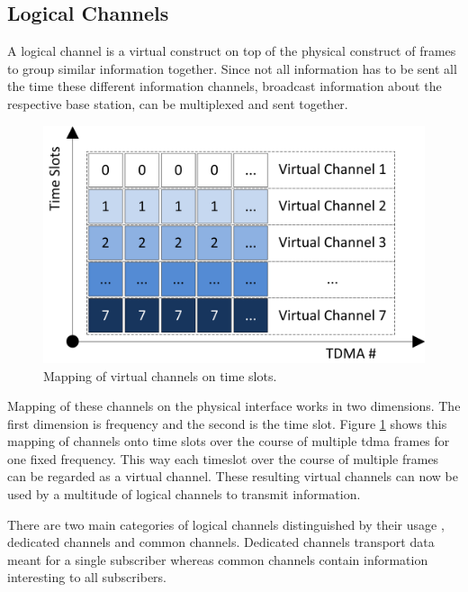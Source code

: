 \subsection{Logical Channels}
\label{sec:channels}
A logical channel is a virtual construct on top of the physical construct of frames to group similar information together.
Since not all information has to be sent all the time these different information channels, \eg broadcast information about the respective base station, can be multiplexed and sent together.
\begin{figure}
	\centering
	\includegraphics{../Images/Channels}
	\caption{Mapping of virtual channels on time slots.}
	\label{fig:channels}
\end{figure}

Mapping of these channels on the physical interface works in two dimensions.
The first dimension is frequency and the second is the time slot.
Figure \ref{fig:channels} shows this mapping of channels onto time slots over the course of multiple \gls{tdma} frames for one fixed frequency.
This way each timeslot over the course of multiple frames can be regarded as a virtual channel.
These resulting virtual channels can now be used by a multitude of logical channels to transmit information.

There are two main categories of logical channels distinguished by their usage \cite{kommsys2006}, dedicated channels and common channels.
Dedicated channels transport data meant for a single subscriber whereas common channels contain information interesting to all subscribers.

